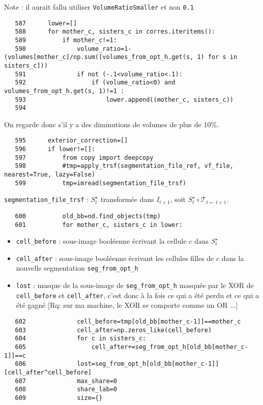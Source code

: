\documentclass{article}
\def \mycolor {red}
\begin{document}
Note : il aurait fallu utiliser \verb|VolumeRatioSmaller| et non \verb|0.1|
\color{black}
\begin{verbatim}
   587	    lower=[]
   588	    for mother_c, sisters_c in corres.iteritems():
   589	        if mother_c!=1:
   590	            volume_ratio=1-(volumes[mother_c]/np.sum([volumes_from_opt_h.get(s, 1) for s in sisters_c]))
   591	            if not (-.1<volume_ratio<.1):
   592	                if (volume_ratio<0) and volumes_from_opt_h.get(s, 1)!=1 :
   593	                    lower.append((mother_c, sisters_c))
   594	    
\end{verbatim} 
\color{\mycolor}
On regarde donc s'il y a des diminutions de volumes de plus de 10\%.
\color{black}
\begin{verbatim}
   595	    exterior_correction=[]
   596	    if lower!=[]:
   597	        from copy import deepcopy
   598	        #tmp=apply_trsf(segmentation_file_ref, vf_file, nearest=True, lazy=False)
   599	        tmp=imread(segmentation_file_trsf)
\end{verbatim} 
\color{\mycolor}
\verb|segmentation_file_trsf| : $S^{\star}_t$ transform\'ee dans $I_{t+1}$, soit $S^{\star}_t \circ \mathcal{T}_{t \leftarrow t+1}$.   
\color{black}
\begin{verbatim}
   600	        old_bb=nd.find_objects(tmp)
   601	        for mother_c, sisters_c in lower:
\end{verbatim} 
\color{\mycolor}
\begin{itemize}
\itemsep -0.5ex
\item \verb|cell_before| : sous-image bool\'eenne \'ecrivant la cellule $c$ dans $S^{\star}_t$ 
\item \verb|cell_after| : sous-image bool\'eenne \'ecrivant les cellules filles de  $c$ dans la nouvelle segmentation \verb|seg_from_opt_h|
\item \verb|lost| : masque de la sous-image de \verb|seg_from_opt_h| masqu\'ee par le  XOR de  \verb|cell_before| et \verb|cell_after|, c'est donc \`a la fois ce qui a \'et\'e perdu et ce qui a \'et\'e gagn\'e [Rq: sur ma machine, le XOR se comporte comme un OR ...]
\end{itemize}
\color{black}
\begin{verbatim}
   602	            cell_before=tmp[old_bb[mother_c-1]]==mother_c
   603	            cell_after=np.zeros_like(cell_before)
   604	            for c in sisters_c:
   605	                cell_after+=seg_from_opt_h[old_bb[mother_c-1]]==c
   606	            lost=seg_from_opt_h[old_bb[mother_c-1]][cell_after^cell_before]
   607	            max_share=0
   608	            share_lab=0
   609	            size={}
\end{verbatim} 
\end{document}

